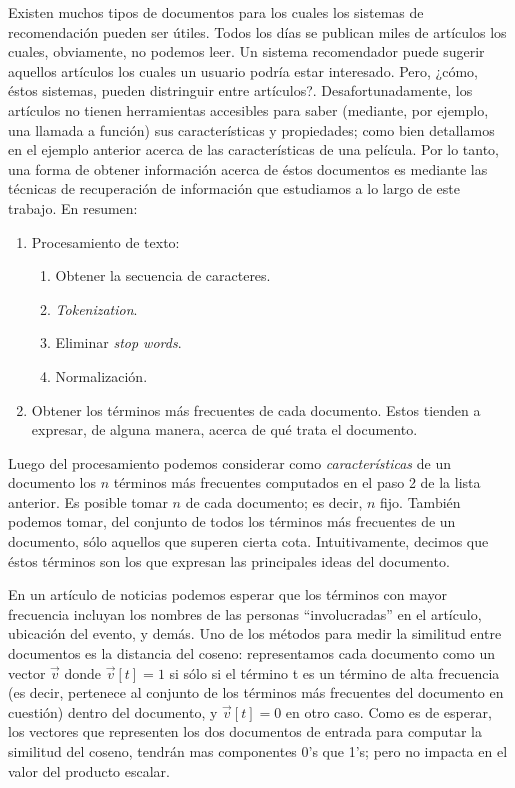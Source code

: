			Existen muchos tipos de documentos para los cuales los sistemas de recomendación pueden ser útiles. Todos los días se publican miles de artículos los cuales, obviamente, no podemos leer. Un sistema recomendador puede sugerir aquellos artículos los cuales un usuario podría estar interesado. Pero, ¿cómo, éstos sistemas, pueden distringuir entre artículos?. Desafortunadamente, los artículos no tienen herramientas accesibles para saber (mediante, por ejemplo, una llamada a función) sus características y propiedades; como bien detallamos en el ejemplo anterior acerca de las características de una película. Por lo tanto, una forma de obtener información acerca de éstos documentos es mediante las técnicas de recuperación de información que estudiamos a lo largo de este trabajo. En resumen:
			\begin{enumerate}
				\item Procesamiento de texto:
					\begin{enumerate}
						\item Obtener la secuencia de caracteres.
						\item \textit{Tokenization}.
						\item Eliminar \textit{stop words}.
						\item Normalización.
					\end{enumerate}			
				 \item Obtener los términos más frecuentes de cada documento. Estos tienden a expresar, de alguna manera, acerca de qué trata el documento.					
			\end{enumerate}
			\par
			Luego del procesamiento podemos considerar como \textit{características} de un documento los $n$ términos más frecuentes computados en el paso 2 de la lista anterior. Es posible tomar $n$ de cada documento; es decir, $n$ fijo. También podemos tomar, del conjunto de todos los términos más frecuentes de un documento, sólo aquellos que superen cierta cota. Intuitivamente, decimos que éstos términos son los que expresan las principales ideas del documento. \par
			En un artículo de noticias podemos esperar que los términos con mayor frecuencia incluyan los nombres de las personas \enquote{involucradas} en el artículo, ubicación del evento, y demás. Uno de los métodos para medir la similitud entre documentos es la distancia del coseno: representamos cada documento como un vector $\vec{v}$ donde $\vec{v}[t] = 1$ si sólo si el término t es un término de alta frecuencia (es decir, pertenece al conjunto de los términos más frecuentes del documento en cuestión) dentro del documento, y $\vec{v}[t] = 0$ en otro caso. Como es de esperar, los vectores que representen los dos documentos de entrada para computar la similitud del coseno, tendrán mas componentes 0's que 1's; pero no impacta en el valor del producto escalar. \par
			

